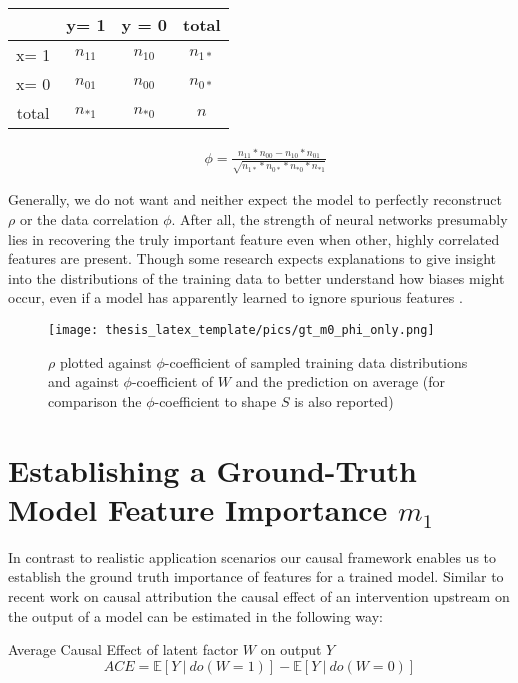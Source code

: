\vspace{1em}
\begin{minipage}[t]{0.45\textwidth}
\begin{tabular}{|c|c|c|c|}
    \hline
     & y= 1 & y = 0 & total  \\  \hline
    x= 1 & $n_{11}$ & $n_{10}$ & $n_{1*}$ \\ \hline
    x= 0 & $n_{01}$ & $n_{00}$ & $n_{0*}$ \\ \hline
    total& $n_{*1}$ & $n_{*0}$ & $n$ \\ \hline
\end{tabular}
\end{minipage}%
\begin{minipage}[c]{0.45\textwidth}
\begin{align}
& \phi = \frac{n_{11} * n_{00} - n_{10}*n_{01}}{\sqrt{n_{1*}*n_{0*}*n_{*0}*n_{*1}}}
\end{align}
\end{minipage}
\vspace{1em}

Generally, we do not want and neither expect the model to perfectly reconstruct $\rho$ or the data correlation $\phi$. After all, the strength of neural networks presumably lies in recovering the truly important feature even when other, highly correlated features are present. Though some research expects explanations to give insight into the distributions of the training data to better understand how biases might occur, even if a model has apparently learned to ignore spurious features \cite{Kindermans2017}. 

\begin{figure}[t!]
    \centering
    \texttt{[image: thesis\_latex\_template/pics/gt\_m0\_phi\_only.png]}
    \caption[Choosing measure for $m_0$]{$\rho$ plotted against $\phi$-coefficient of sampled training data distributions and against $\phi$-coefficient of $W$ and the prediction on average (for comparison the $\phi$-coefficient to shape $S$ is also reported) }
    \label{fig:finding_rho}
\end{figure}

\section{Establishing a Ground-Truth Model Feature Importance $m_1$}\label{section:gt_measure}
In contrast to realistic application scenarios our causal framework enables us to establish the ground truth importance of features for a trained model. Similar to recent work on causal attribution \cite{Goyal2019,Parafita2019,Karimi2023} the causal effect of an intervention upstream on the output of a model can be estimated in the following way:
\begin{center}
Average Causal Effect of latent factor $W$ on output $Y$ \\
\begin{equation}
\displaystyle ACE = \mathbb{E} [ Y \ | \ do(W=1) ] - \mathbb{E} [ Y \ | \ do(W=0) ] 
\end{equation}
\end{center}

